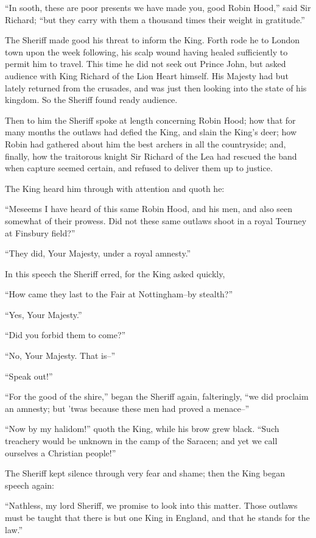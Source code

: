 ``In sooth, these are poor presents we have made you, good Robin Hood,''
said Sir Richard; ``but they carry with them a thousand times their
weight in gratitude.''

The Sheriff made good his threat to inform the King. Forth rode he to
London town upon the week following, his scalp wound having healed
sufficiently to permit him to travel. This time he did not seek out
Prince John, but asked audience with King Richard of the Lion Heart
himself. His Majesty had but lately returned from the crusades, and was
just then looking into the state of his kingdom. So the Sheriff found
ready audience.

Then to him the Sheriff spoke at length concerning Robin Hood; how that
for many months the outlaws had defied the King, and slain the King's
deer; how Robin had gathered about him the best archers in all the
countryside; and, finally, how the traitorous knight Sir Richard of the
Lea had rescued the band when capture seemed certain, and refused to
deliver them up to justice.

The King heard him through with attention and quoth he:

``Meseems I have heard of this same Robin Hood, and his men, and also
seen somewhat of their prowess. Did not these same outlaws shoot in a
royal Tourney at Finsbury field?''

``They did, Your Majesty, under a royal amnesty.''

In this speech the Sheriff erred, for the King asked quickly,

``How came they last to the Fair at Nottingham--by stealth?''

``Yes, Your Majesty.''

``Did you forbid them to come?''

``No, Your Majesty. That is--''

``Speak out!''

``For the good of the shire,'' began the Sheriff again, falteringly,
``we did proclaim an amnesty; but 'twas because these men had proved a
menace--''

``Now by my halidom!'' quoth the King, while his brow grew black. ``Such
treachery would be unknown in the camp of the Saracen; and yet we call
ourselves a Christian people!''

The Sheriff kept silence through very fear and shame; then the King
began speech again:

``Nathless, my lord Sheriff, we promise to look into this matter. Those
outlaws must be taught that there is but one King in England, and that
he stands for the law.''

